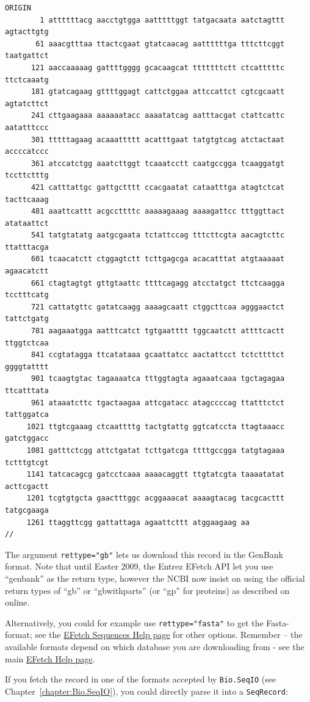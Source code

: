 \documentclass{report}
\begin{document}
\begin{verbatim}
ORIGIN      
        1 attttttacg aacctgtgga aatttttggt tatgacaata aatctagttt agtacttgtg
       61 aaacgtttaa ttactcgaat gtatcaacag aattttttga tttcttcggt taatgattct
      121 aaccaaaaag gattttgggg gcacaagcat tttttttctt ctcatttttc ttctcaaatg
      181 gtatcagaag gttttggagt cattctggaa attccattct cgtcgcaatt agtatcttct
      241 cttgaagaaa aaaaaatacc aaaatatcag aatttacgat ctattcattc aatatttccc
      301 tttttagaag acaaattttt acatttgaat tatgtgtcag atctactaat accccatccc
      361 atccatctgg aaatcttggt tcaaatcctt caatgccgga tcaaggatgt tccttctttg
      421 catttattgc gattgctttt ccacgaatat cataatttga atagtctcat tacttcaaag
      481 aaattcattt acgccttttc aaaaagaaag aaaagattcc tttggttact atataattct
      541 tatgtatatg aatgcgaata tctattccag tttcttcgta aacagtcttc ttatttacga
      601 tcaacatctt ctggagtctt tcttgagcga acacatttat atgtaaaaat agaacatctt
      661 ctagtagtgt gttgtaattc ttttcagagg atcctatgct ttctcaagga tcctttcatg
      721 cattatgttc gatatcaagg aaaagcaatt ctggcttcaa agggaactct tattctgatg
      781 aagaaatgga aatttcatct tgtgaatttt tggcaatctt attttcactt ttggtctcaa
      841 ccgtatagga ttcatataaa gcaattatcc aactattcct tctcttttct ggggtatttt
      901 tcaagtgtac tagaaaatca tttggtagta agaaatcaaa tgctagagaa ttcatttata
      961 ataaatcttc tgactaagaa attcgatacc atagccccag ttatttctct tattggatca
     1021 ttgtcgaaag ctcaattttg tactgtattg ggtcatccta ttagtaaacc gatctggacc
     1081 gatttctcgg attctgatat tcttgatcga ttttgccgga tatgtagaaa tctttgtcgt
     1141 tatcacagcg gatcctcaaa aaaacaggtt ttgtatcgta taaaatatat acttcgactt
     1201 tcgtgtgcta gaactttggc acggaaacat aaaagtacag tacgcacttt tatgcgaaga
     1261 ttaggttcgg gattattaga agaattcttt atggaagaag aa
//
\end{verbatim}

The argument \verb+rettype="gb"+ lets us download this record in the GenBank format.
Note that until Easter 2009, the Entrez EFetch API let you use ``genbank'' as the
return type, however the NCBI now insist on using the official return types of
``gb'' or ``gbwithparts'' (or ``gp'' for proteins) as described on online.

Alternatively, you could for example use \verb+rettype="fasta"+ to get the Fasta-format; see the \href{http://www.ncbi.nlm.nih.gov/entrez/query/static/efetchseq\_help.html}{EFetch Sequences Help page} for other options. Remember -- the available formats depend on which database you are downloading from - see the main \href{http://eutils.ncbi.nlm.nih.gov/entrez/query/static/efetch\_help.html}{EFetch Help page}.

If you fetch the record in one of the formats accepted by \verb+Bio.SeqIO+ (see Chapter~\ref{chapter:Bio.SeqIO}), you could directly parse it into a \verb+SeqRecord+:
\end{document}
